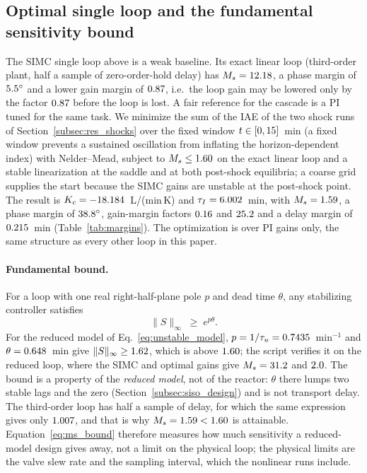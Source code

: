 

\subsection{Optimal single loop and the fundamental sensitivity bound}
\label{subsec:siso_opt}
The SIMC single loop above is a weak baseline. Its exact linear loop (third-order plant, half a sample of zero-order-hold delay) has $M_s=12.18$, a phase margin of $5.5^\circ$ and a lower gain margin of $0.87$, i.e.\ the loop gain may be lowered only by the factor $0.87$ before the loop is lost. A fair reference for the cascade is a PI tuned for the same task. We minimize the sum of the IAE of the two shock runs of Section~\ref{subsec:res_shocks} over the fixed window $t\in[0,15]$~min (a fixed window prevents a sustained oscillation from inflating the horizon-dependent index) with Nelder--Mead, subject to $M_s\le1.60$ on the exact linear loop and a stable linearization at the saddle and at both post-shock equilibria; a coarse grid supplies the start because the SIMC gains are unstable at the post-shock point. The result is $K_c=-18.184$~L/(min\,K) and $\tau_I=6.002$~min, with $M_s=1.59$, a phase margin of $38.8^\circ$, gain-margin factors $0.16$ and $25.2$ and a delay margin of $0.215$~min (Table~\ref{tab:margins}). The optimization is over PI gains only, the same structure as every other loop in this paper.

\paragraph{Fundamental bound.} For a loop with one real right-half-plane pole $p$ and dead time $\theta$, any stabilizing controller satisfies \cite{skogestad2005multivariable,stein2003respect}
\begin{equation}
\|S\|_\infty\;\ge\;e^{p\theta}.
\label{eq:ms_bound}
\end{equation}
For the reduced model of Eq.~\eqref{eq:unstable_model}, $p=1/\tau_u=0.7435$~min$^{-1}$ and $\theta=0.648$~min give $\|S\|_\infty\ge1.62$, which is above $1.60$; the script verifies it on the reduced loop, where the SIMC and optimal gains give $M_s=31.2$ and $2.0$. The bound is a property of the \emph{reduced model}, not of the reactor: $\theta$ there lumps two stable lags and the zero (Section~\ref{subsec:siso_design}) and is not transport delay. The third-order loop has half a sample of delay, for which the same expression gives only $1.007$, and that is why $M_s=1.59<1.60$ is attainable. Equation~\eqref{eq:ms_bound} therefore measures how much sensitivity a reduced-model design gives away, not a limit on the physical loop; the physical limits are the valve slew rate and the sampling interval, which the nonlinear runs include.

